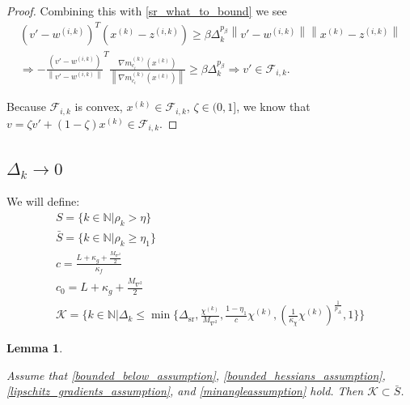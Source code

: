 \documentclass{article}
\newtheorem{lemma}[theorem]{Lemma}
\theoremstyle{case}
\newcommand{\maxhessian}{{M_{\nabla^2}}}
\newcommand{\dsr}{{\Delta_{\text{sr}}}}
\newcommand{\xk}{{x^{(k)}}}
\newcommand{\naturals}{\mathbb N}
\newcommand{\dk}{\Delta_k}
\newcommand{\chik}{{\chi^{(k)}}}
\newcommand{\rk}{\rho_k}
\newcommand{\zik}{{z^{(i, k)}}}
\newcommand{\fik}{{\mathcal F_{i, k}}}
\newcommand{\wik}{{w^{(i, k)}}}
\newcommand{\gmcik}{{\nabla m_{c_i}^{(k)}(\xk)}}
\begin{document}
\begin{proof}
Combining this with \cref{sr_what_to_bound} we see
\begin{align*}
\left(v' - \wik \right)^T\left(\xk - \zik \right) \ge \beta \dk^{p_{\beta}}\left\|v' - \wik\right\| \left\|\xk - \zik\right\| \\
\Longrightarrow -\frac {\left(v' - \wik \right)}{\left\|v' - \wik \right\|}^T\frac{\gmcik}{\left\|\gmcik\right\|}\ge\beta \dk^{p_{\beta}} 
\Longrightarrow v' \in \fik.
\end{align*}

Because $\fik$ is convex, $\xk \in \fik$, $\zeta \in (0, 1]$, we know that $v = \zeta v' + (1 - \zeta)\xk\in\fik$.
\end{proof}



\subsection{$\dk \to 0$}

We will define:
\begin{align}
S = \{k \in \naturals | \rk > \eta \} \\
\bar{S} = \{k \in \naturals | \rk \ge \eta_1 \} \\
c = \frac{L + \kappa_{g} + \frac {\maxhessian} 2}{\kappa_f} \\
c_0 = L + \kappa_{g} + \frac {\maxhessian} 2 \\
\mathcal K = \big \{ k \in \naturals | \dk \le \min \{ \dsr, \frac {\chik}{\maxhessian}, \frac{1-\eta_1}{c}\chik, \left(\frac 1 {\kappa_{\chi}}  \chik\right)^{\frac 1 {p_{\Delta}}}, 1 \} \big \} \label{define_mathcal_k}
\end{align}


\begin{lemma}
\label{mathcal_k_subset_bar_s}



Assume that 
\cref{bounded_below_assumption},
\cref{bounded_hessians_assumption},
\cref{lipschitz_gradients_assumption},
and \cref{minangleassumption} hold.
Then $\mathcal K \subset \bar{S}$.
\end{lemma}
 
\end{document}
